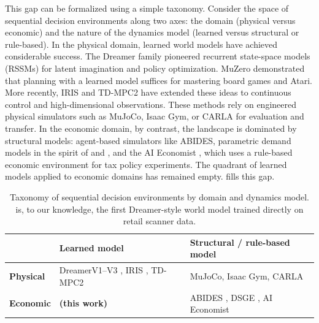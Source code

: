 This gap can be formalized using a simple taxonomy. Consider the space of sequential decision environments along two axes: the domain (physical versus economic) and the nature of the dynamics model (learned versus structural or rule-based). In the physical domain, learned world models have achieved considerable success. The Dreamer family \citep{hafner2020dreamerv1, hafner2021dreamerv2, hafner2023dreamerv3} pioneered recurrent state-space models (RSSMs) for latent imagination and policy optimization. MuZero \citep{schrittwieser2020muzero} demonstrated that planning with a learned model suffices for mastering board games and Atari. More recently, IRIS \citep{micheli2023iris} and TD-MPC2 \citep{hansen2024tdmpc2} have extended these ideas to continuous control and high-dimensional observations. These methods rely on engineered physical simulators such as MuJoCo, Isaac Gym, or CARLA for evaluation and transfer. In the economic domain, by contrast, the landscape is dominated by structural models: agent-based simulators like ABIDES, parametric demand models in the spirit of \citet{berry1995automobile} and \citet{nevo2001measuring}, and the AI Economist \citep{zheng2020aieconomist}, which uses a rule-based economic environment for tax policy experiments. The quadrant of learned models applied to economic domains has remained empty. \dreamprice{} fills this gap.

\begin{table}[t]
\centering
\caption{Taxonomy of sequential decision environments by domain and dynamics model. \dreamprice{} is, to our knowledge, the first Dreamer-style world model trained directly on retail scanner data.}
\label{tab:gap-matrix}
\small
\begin{tabular}{@{}l p{} p{}@{}}
\toprule
& \textbf{Learned model} & \textbf{Structural / rule-based model} \\
\midrule
\textbf{Physical} & DreamerV1--V3 \citep{hafner2020dreamerv1, hafner2021dreamerv2, hafner2023dreamerv3}, IRIS \citep{micheli2023iris}, TD-MPC2 \citep{hansen2024tdmpc2} & MuJoCo, Isaac Gym, CARLA \\[4pt]
\textbf{Economic} & \textbf{\dreamprice{} (this work)} & ABIDES \citep{byrd2020abides}, DSGE \citep{smets2007shocks}, AI Economist \citep{zheng2020aieconomist} \\
\bottomrule
\end{tabular}
\end{table}

